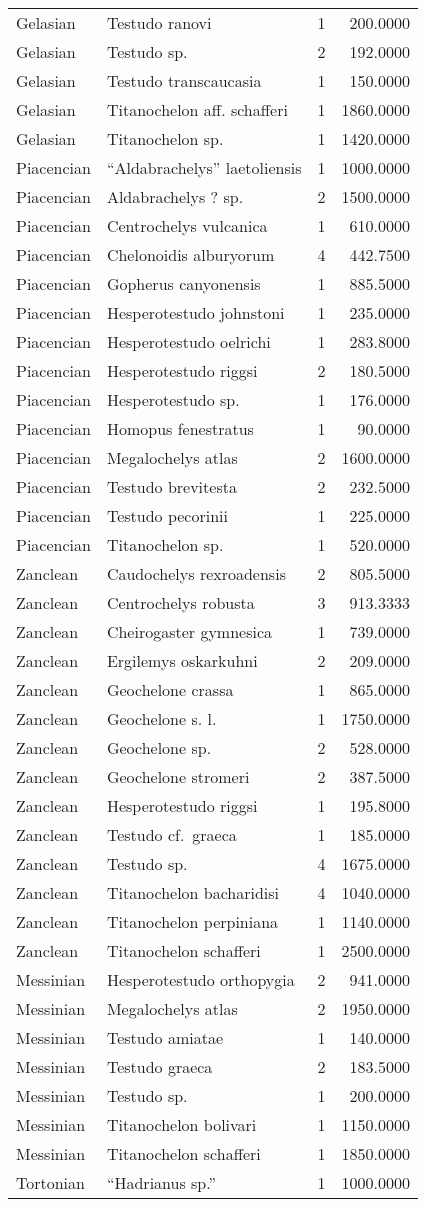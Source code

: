 \begin{longtable}[]{@{}llrr@{}}
	Gelasian & Testudo ranovi & 1 & 200.0000\tabularnewline
	Gelasian & Testudo sp. & 2 & 192.0000\tabularnewline
	Gelasian & Testudo transcaucasia & 1 & 150.0000\tabularnewline
	Gelasian & Titanochelon aff. schafferi & 1 & 1860.0000\tabularnewline
	Gelasian & Titanochelon sp. & 1 & 1420.0000\tabularnewline
	Piacencian & ``Aldabrachelys'' laetoliensis & 1 &
	1000.0000\tabularnewline
	Piacencian & Aldabrachelys ? sp. & 2 & 1500.0000\tabularnewline
	Piacencian & Centrochelys vulcanica & 1 & 610.0000\tabularnewline
	Piacencian & Chelonoidis alburyorum & 4 & 442.7500\tabularnewline
	Piacencian & Gopherus canyonensis & 1 & 885.5000\tabularnewline
	Piacencian & Hesperotestudo johnstoni & 1 & 235.0000\tabularnewline
	Piacencian & Hesperotestudo oelrichi & 1 & 283.8000\tabularnewline
	Piacencian & Hesperotestudo riggsi & 2 & 180.5000\tabularnewline
	Piacencian & Hesperotestudo sp. & 1 & 176.0000\tabularnewline
	Piacencian & Homopus fenestratus & 1 & 90.0000\tabularnewline
	Piacencian & Megalochelys atlas & 2 & 1600.0000\tabularnewline
	Piacencian & Testudo brevitesta & 2 & 232.5000\tabularnewline
	Piacencian & Testudo pecorinii & 1 & 225.0000\tabularnewline
	Piacencian & Titanochelon sp. & 1 & 520.0000\tabularnewline
	Zanclean & Caudochelys rexroadensis & 2 & 805.5000\tabularnewline
	Zanclean & Centrochelys robusta & 3 & 913.3333\tabularnewline
	Zanclean & Cheirogaster gymnesica & 1 & 739.0000\tabularnewline
	Zanclean & Ergilemys oskarkuhni & 2 & 209.0000\tabularnewline
	Zanclean & Geochelone crassa & 1 & 865.0000\tabularnewline
	Zanclean & Geochelone s. l. & 1 & 1750.0000\tabularnewline
	Zanclean & Geochelone sp. & 2 & 528.0000\tabularnewline
	Zanclean & Geochelone stromeri & 2 & 387.5000\tabularnewline
	Zanclean & Hesperotestudo riggsi & 1 & 195.8000\tabularnewline
	Zanclean & Testudo cf.~graeca & 1 & 185.0000\tabularnewline
	Zanclean & Testudo sp. & 4 & 1675.0000\tabularnewline
	Zanclean & Titanochelon bacharidisi & 4 & 1040.0000\tabularnewline
	Zanclean & Titanochelon perpiniana & 1 & 1140.0000\tabularnewline
	Zanclean & Titanochelon schafferi & 1 & 2500.0000\tabularnewline
	Messinian & Hesperotestudo orthopygia & 2 & 941.0000\tabularnewline
	Messinian & Megalochelys atlas & 2 & 1950.0000\tabularnewline
	Messinian & Testudo amiatae & 1 & 140.0000\tabularnewline
	Messinian & Testudo graeca & 2 & 183.5000\tabularnewline
	Messinian & Testudo sp. & 1 & 200.0000\tabularnewline
	Messinian & Titanochelon bolivari & 1 & 1150.0000\tabularnewline
	Messinian & Titanochelon schafferi & 1 & 1850.0000\tabularnewline
	Tortonian & ``Hadrianus sp.'' & 1 & 1000.0000\tabularnewline

\end{longtable}
